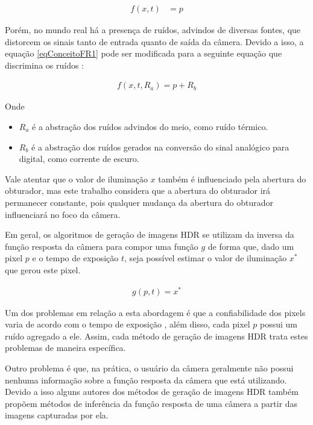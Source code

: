 	
\begin{align} \label{eqConceitoFR1}
          f(x,t) &= p
\end{align}

	Porém, no mundo real há a presença de ruídos, advindos de diversas fontes, que distorcem os sinais tanto de entrada quanto de saída da câmera. Devido a isso, a equação \ref{eqConceitoFR1} pode ser modificada para a seguinte equação que discrimina os ruídos \cite{bestHDRs}:

\begin{align} \label{eqConceitoFR2}
						f (x, t, R_a) = p + R_b
\end{align}

Onde
\begin{itemize}
	\item $R_a$ é a abstração dos ruídos advindos do meio, como ruído térmico.
	\item $R_b$ é a abstração dos ruídos gerados na conversão do sinal analógico para digital, como corrente de escuro.
\end{itemize} 
		
	Vale atentar que o valor de iluminação $x$ também é influenciado pela abertura do obturador, mas este trabalho considera que a abertura do obturador irá permanecer constante, pois qualquer mudança da abertura do obturador influenciará no foco da câmera. 
	
	Em geral, os algoritmos de geração de imagens HDR se utilizam da inversa da função resposta da câmera para compor uma função $g$ de forma que, dado um pixel $p$ e o tempo de exposição $t$, seja possível estimar o valor de iluminação $x^*$ que gerou este pixel.

\begin{align} \label{eqConceitoFR3}
	g(p, t) = x^*
\end{align}
	
	Um dos problemas em relação a esta abordagem é que a confiabilidade dos pixels varia de acordo com o tempo de exposição \cite{robertson}, além disso, cada pixel $p$ possui um ruído agregado a ele. Assim, cada método de geração de imagens HDR trata estes problemas de maneira específica.
	
	Outro problema é que, na prática, o usuário da câmera geralmente não possui nenhuma informação sobre a função resposta da câmera que está utilizando. Devido a isso alguns autores dos métodos de geração de imagens HDR também propõem métodos de inferência da função resposta de uma câmera a partir das imagens capturadas por ela.

